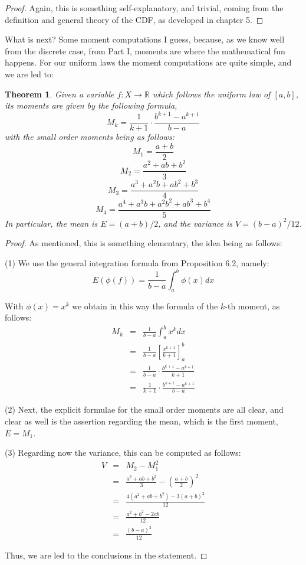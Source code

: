 \documentclass[12pt]{amsbook}
\newtheorem{theorem}{Theorem}[chapter]
\begin{document}
\begin{proof}
Again, this is something self-explanatory, and trivial, coming from the definition and general theory of the CDF, as developed in chapter 5.
\end{proof}

What is next? Some moment computations I guess, because, as we know well from the discrete case, from Part I, moments are where the mathematical fun happens. For our uniform laws the moment computations are quite simple, and we are led to:

\begin{theorem}
Given a variable $f:X\to\mathbb R$ which follows the uniform law of $[a,b]$, its moments are given by the following formula,
$$M_k=\frac{1}{k+1}\cdot\frac{b^{k+1}-a^{k+1}}{b-a}$$
with the small order moments being as follows:
$$M_1=\frac{a+b}{2}$$
$$M_2=\frac{a^2+ab+b^2}{3}$$
$$M_3=\frac{a^3+a^2b+ab^2+b^3}{4}$$
$$M_4=\frac{a^4+a^3b+a^2b^2+ab^3+b^4}{5}$$
In particular, the mean is $E=(a+b)/2$, and the variance is $V=(b-a)^2/12$.
\end{theorem}

\begin{proof}
As mentioned, this is something elementary, the idea being as follows:

\medskip

(1) We use the general integration formula from Proposition 6.2, namely:
$$E(\phi(f))=\frac{1}{b-a}\int_a^b\phi(x)dx$$

With $\phi(x)=x^k$ we obtain in this way the formula of the $k$-th moment, as follows:
\begin{eqnarray*}
M_k
&=&\frac{1}{b-a}\int_a^bx^kdx\\
&=&\frac{1}{b-a}\left[\frac{x^{k+1}}{k+1}\right]_a^b\\
&=&\frac{1}{b-a}\cdot\frac{b^{k+1}-a^{k+1}}{k+1}\\
&=&\frac{1}{k+1}\cdot\frac{b^{k+1}-a^{k+1}}{b-a}
\end{eqnarray*}

(2) Next, the explicit formulae for the small order moments are all clear, and clear as well is the assertion regarding the mean, which is the first moment, $E=M_1$.

\medskip

(3) Regarding now the variance, this can be computed as follows:
\begin{eqnarray*}
V
&=&M_2-M_1^2\\
&=&\frac{a^2+ab+b^2}{3}-\left(\frac{a+b}{2}\right)^2\\
&=&\frac{4(a^2+ab+b^2)-3(a+b)^2}{12}\\
&=&\frac{a^2+b^2-2ab}{12}\\
&=&\frac{(b-a)^2}{12}
\end{eqnarray*}

Thus, we are led to the conclusions in the statement.
\end{proof}
\end{document}
